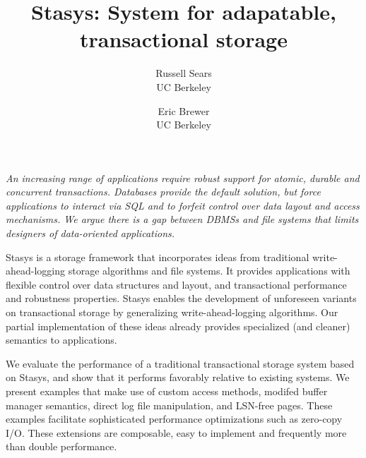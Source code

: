 \documentclass[letterpaper,twocolumn,10pt]{article}
\newcommand{\yad}{Stasys\xspace}
\begin{document}
\date{}


\title{\Large \bf \yad: System for adapatable, transactional storage}

\author{
{\rm Russell Sears}\\
UC Berkeley
\and
{\rm Eric Brewer}\\
UC Berkeley
} %

\maketitle




{\em An increasing range of applications require robust support for atomic, durable and concurrent
transactions.  Databases provide the default solution, but force
applications to interact via SQL and to forfeit control over data
layout and access mechanisms.  We argue there is a gap between DBMSs and file systems that limits designers of data-oriented applications.

\yad is a storage framework that incorporates ideas from traditional
write-ahead-logging storage algorithms and file systems.
It provides applications with flexible control over data structures and layout, and transactional performance and robustness properties.
\yad enables the development of
unforeseen variants on transactional storage by generalizing
write-ahead-logging algorithms.  Our partial implementation of these
ideas already provides specialized (and cleaner) semantics to applications.

We evaluate the performance of a traditional transactional storage
system based on \yad, and show that it performs favorably relative to existing
systems.  We present examples that make use of custom access methods, modifed
buffer manager semantics, direct log file manipulation, and LSN-free
pages.  These examples facilitate sophisticated performance 
optimizations such as zero-copy I/O.  These extensions are composable,
easy to implement and frequently more than double performance.

}
\end{document}
